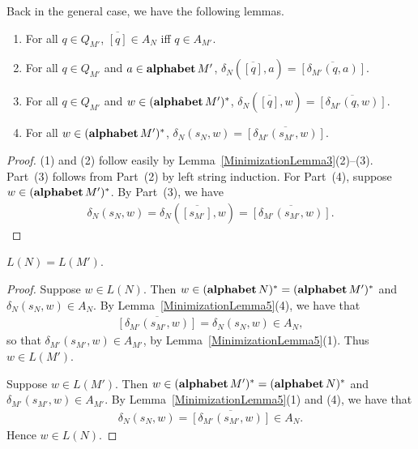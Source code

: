 Back in the general case, we have the following lemmas.

\begin{lemma}
\label{MinimizationLemma5}
\begin{enumerate}[\quad(1)]
\item For all $q\in Q_{M'}$, $\overline{[q]}\in A_N$ iff $q\in A_{M'}$.

\item For all $q\in Q_{M'}$ and $a\in\mathbf{alphabet}\,M'$,
  $\delta_N(\overline{[q]},a) = \overline{[\delta_{M'}(q,a)]}$.

\item For all $q\in Q_{M'}$ and $w\in(\mathbf{alphabet}\,M')^*$,
  $\delta_N(\overline{[q]},w) = \overline{[\delta_{M'}(q, w)]}$.

\item For all $w\in(\mathbf{alphabet}\,M')^*$, $\delta_N(s_N,w) =
  \overline{[\delta_{M'}(s_{M'}, w)]}$.
\end{enumerate}
\end{lemma}

\begin{proof}
(1) and (2) follow easily by Lemma~\ref{MinimizationLemma3}(2)--(3).
Part~(3) follows from Part~(2) by left string induction.  For
Part~(4), suppose $w\in(\mathbf{alphabet}\,M')^*$.  By Part~(3), we have
\begin{gather*}
\delta_N(s_N,w) =
\delta_N(\overline{[s_{M'}]}, w) =
\overline{[\delta_{M'}(s_{M'}, w)]} .
\end{gather*}
\end{proof}

\begin{lemma}
\label{MinimizationLemma6}
$L(N)=L(M')$.
\end{lemma}

\begin{proof}
Suppose $w\in L(N)$.  Then $w\in(\mathbf{alphabet}\,N)^*=(\mathbf{alphabet}\,M')^*$ and
$\delta_N(s_N,w)\in A_N$.
By Lemma~\ref{MinimizationLemma5}(4), we have that
\begin{gather*}
  \overline{[\delta_{M'}(s_{M'}, w)]} =
  \delta_N(s_N,w) \in A_N ,
\end{gather*}
so that $\delta_{M'}(s_{M'}, w)\in A_{M'}$, by
Lemma~\ref{MinimizationLemma5}(1).  Thus $w\in L(M')$.

Suppose $w\in L(M')$.  Then $w\in(\mathbf{alphabet}\,M')^*=(\mathbf{alphabet}\,N)^*$ and
$\delta_{M'}(s_{M'}, w)\in A_{M'}$.  By 
Lemma~\ref{MinimizationLemma5}(1) and (4), we have that
\begin{gather*}
  \delta_N(s_N,w) =
  \overline{[\delta_{M'}(s_{M'}, w)]}
  \in A_N .
\end{gather*}
Hence $w\in L(N)$.
\end{proof}

